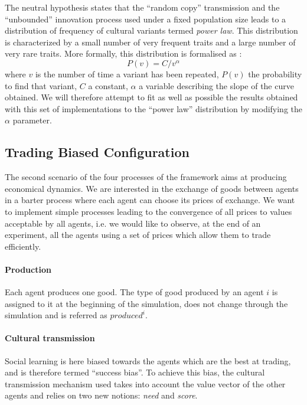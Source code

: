 \documentclass{wscpaperproc}
\begin{document}
The neutral hypothesis states that the ``random copy'' transmission and the ``unbounded'' innovation process used under a fixed population size leads to a distribution of frequency of cultural variants termed \emph{power law}. This distribution is characterized by a small number of very frequent traits and a large number of very rare traits. 
More formally, this distribution is formalised as : $$P(v)=C/v^\alpha $$ where $v$ is the number of time a variant has been repeated, $P(v)$ the probability to find that variant, $C$ a constant, $\alpha$ a variable describing the slope of the curve obtained. We will therefore attempt to fit as well as possible the results obtained with this set of implementations to the ``power law'' distribution by modifying the $\alpha$ parameter.

\subsection{Trading Biased Configuration}\label{sec:trade}

The second scenario of the four processes of the framework aims at producing economical dynamics. We are interested in the exchange of goods between agents in a barter process where each agent can choose its prices of exchange. We want to implement simple processes leading to the convergence of all prices to values acceptable by all agents, i.e. we would like to observe, at the end of an experiment, all the agents using a set of prices which allow them to trade efficiently.

\paragraph{Production}
Each agent produces one good. The type of good produced by an agent $i$ is assigned to it at the beginning of the simulation, does not change through the simulation and is referred as $produced^i$. 

\paragraph{Cultural transmission}
Social learning is here biased towards the agents which are the best at trading, and is therefore termed ``success bias''. To achieve this bias, the cultural transmission mechanism used takes into account the value vector of the other agents and relies on two new notions: \emph{need} and \emph{score}. 
\end{document}
